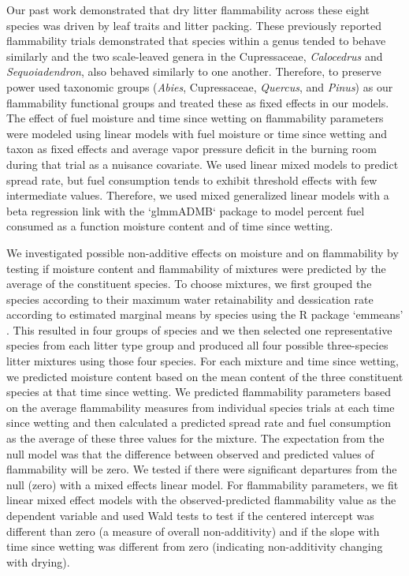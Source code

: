 \documentclass[letterpaper,12pt]{article}
\begin{document}
Our past work \citep{Magalhaes+Schwilk-2012} demonstrated that dry litter
flammability across these eight species was driven by leaf traits and litter
packing. These previously reported flammability trials demonstrated that
species within a genus tended to behave similarly and the two scale-leaved
genera in the Cupressaceae, \emph{Calocedrus} and \emph{Sequoiadendron}, also
behaved similarly to one another. Therefore, to preserve power used taxonomic
groups (\emph{Abies}, Cupressaceae, \emph{Quercus}, and \emph{Pinus}) as our
flammability functional groups and treated these as fixed effects in our
models. The effect of fuel moisture and time since wetting on flammability
parameters were modeled using linear models with fuel moisture or time since
wetting and taxon as fixed effects and average vapor pressure deficit in the
burning room during that trial as a nuisance covariate. We used linear mixed
models to predict spread rate, but fuel consumption tends to exhibit threshold
effects with few intermediate values. Therefore, we used mixed generalized
linear models with a beta regression link with the `glmmADMB` package
\citep{Skaug_Fournier_etal-2016} to model percent fuel consumed as a function
moisture content and of time since wetting.

We investigated possible non-additive effects on moisture and on flammability
by testing if moisture content and flammability of mixtures were predicted by
the average of the constituent species. To choose mixtures, we first grouped
the species according to their maximum water retainability and dessication rate
according to estimated marginal means by species using the R package `emmeans'
\citep{Lenth-2019}. This resulted in four groups of species and we then selected
one representative species from each litter type group and produced all four
possible three-species litter mixtures using those four species. For each
mixture and time since wetting, we predicted moisture content based on the mean
content of the three constituent species at that time since wetting. We
predicted flammability parameters based on the average flammability measures
from individual species trials at each time since wetting and then calculated a
predicted spread rate and fuel consumption as the average of these three values
for the mixture. The expectation from the null model was that the difference
between observed and predicted values of flammability will be zero. We tested
if there were significant departures from the null (zero) with a mixed effects
linear model. For flammability parameters, we fit linear mixed effect models
with the observed-predicted flammability value as the dependent variable and
used Wald tests to test if the centered intercept was different than zero (a
measure of overall non-additivity) and if the slope with time since wetting was
different from zero (indicating non-additivity changing with drying).
\end{document}
